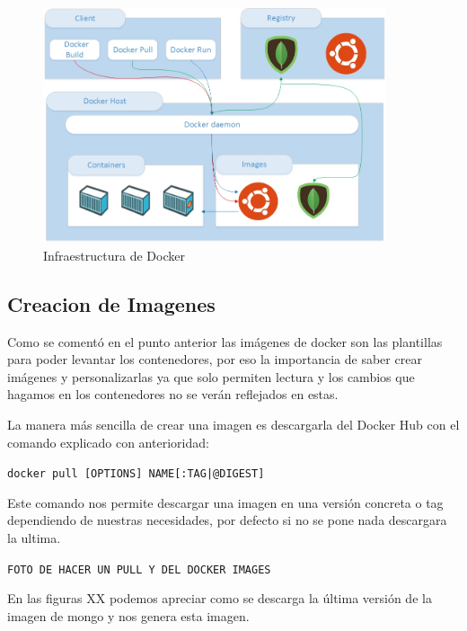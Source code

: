 \begin{figure}[htb]
\begin{center}
\includegraphics[width=0.90\textwidth]{./setup/Infraestructura}
\caption{Infraestructura de Docker}
\label{Inf:Infraestructura}
\end{center}
\end{figure}

\subsection{Creacion de Imagenes}

Como se comentó en el punto anterior las imágenes de docker son las plantillas para poder levantar los contenedores, por eso la importancia de saber crear imágenes y personalizarlas ya que solo permiten lectura y los cambios que hagamos en los contenedores no se verán reflejados en estas.

La manera más sencilla de crear una imagen es descargarla del Docker Hub con el comando explicado con anterioridad:

\begin{center}
\texttt{docker pull [OPTIONS] NAME[:TAG|@DIGEST]}
\end{center}

Este comando nos permite descargar una imagen en una versión concreta o tag dependiendo de nuestras necesidades, por defecto si no se pone nada descargara la ultima. 

\begin{center}
\texttt{FOTO DE HACER UN PULL Y DEL DOCKER IMAGES}
\end{center}

En las figuras XX podemos apreciar como se descarga la última versión de la imagen de mongo y nos genera esta imagen. 


